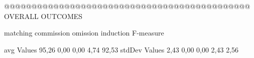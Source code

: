 @@@@@@@@@@@@@@@@@@@@@@@@@@@@@@@@@@@@@@@@@@@@@ OVERALL OUTCOMES

               matching commission   omission  induction  F-measure
               
avg Values      95,26       0,00       0,00       4,74     92,53        
stdDev Values    2,43       0,00       0,00       2,43      2,56        
